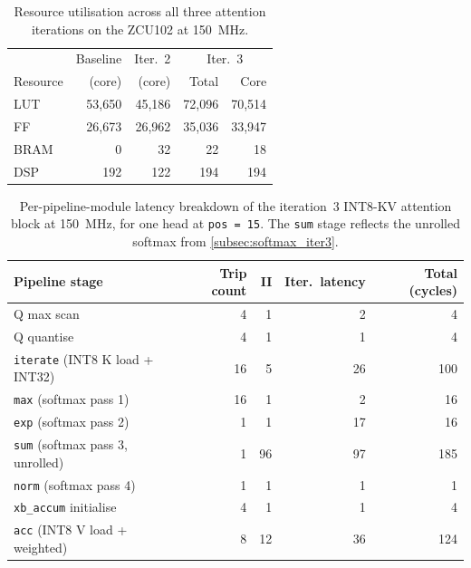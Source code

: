 \begin{table}[H]
  \centering
  \begin{tabular}{lrrrr}
    \toprule
    & Baseline & Iter.~2 & \multicolumn{2}{c}{Iter.~3} \\
    Resource & (core) & (core) & Total & Core \\
    \midrule
    LUT  & 53{,}650 & 45{,}186 & 72{,}096 & 70{,}514 \\
    FF   & 26{,}673 & 26{,}962 & 35{,}036 & 33{,}947 \\
    BRAM & 0        & 32       & 22       & 18 \\
    DSP  & 192      & 122      & 194      & 194 \\
    \bottomrule
  \end{tabular}
  \caption{Resource utilisation across all three attention iterations
           on the ZCU102 at \SI{150}{\mega\hertz}.}
  \label{tab:attn_all_resources}
\end{table}

\begin{table}[H]
  \centering
  \begin{tabular}{lrrrr}
    \toprule
    Pipeline stage & Trip count & II & Iter.\ latency & Total (cycles) \\
    \midrule
    Q max scan                                  &  4 &  1 &  2 &   4 \\
    Q quantise                                  &  4 &  1 &  1 &   4 \\
    \texttt{iterate} (INT8 K load + INT32)      & 16 &  5 & 26 & 100 \\
    \texttt{max}     (softmax pass 1)           & 16 &  1 &  2 &  16 \\
    \texttt{exp}     (softmax pass 2)           &  1 &  1 & 17 &  16 \\
    \texttt{sum}     (softmax pass 3, unrolled) &  1 & 96 & 97 & 185 \\
    \texttt{norm}    (softmax pass 4)           &  1 &  1 &  1 &   1 \\
    \texttt{xb\_accum} initialise               &  4 &  1 &  1 &   4 \\
    \texttt{acc}     (INT8 V load + weighted)   &  8 & 12 & 36 & 124 \\
    \bottomrule
  \end{tabular}
  \caption{Per-pipeline-module latency breakdown of the iteration~3
           INT8-KV attention block at \SI{150}{\mega\hertz}, for one
           head at \texttt{pos\,=\,15}. The \texttt{sum} stage reflects
           the unrolled softmax from \cref{subsec:softmax_iter3}.}
  \label{tab:attn_kvint8_latency}
\end{table}

